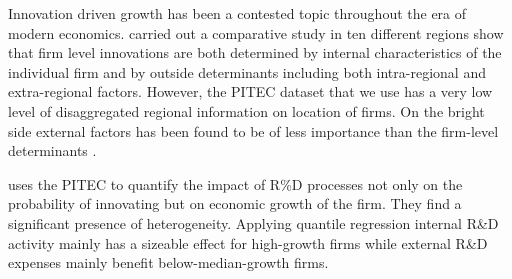 \label{sec:background}
Innovation driven growth has been a contested topic throughout the era of modern economics. \citet{sternberg2001firm} carried out a comparative study in ten different regions show that firm level innovations are both determined by internal characteristics of the individual firm and by outside determinants including both intra-regional and extra-regional factors. However, the PITEC dataset that we use has a very low level of disaggregated regional information on location of firms. On the bright side external factors has been found to be of less importance than the firm-level determinants \citep{sternberg2001firm}.

\citet{segarra2014high} uses the PITEC to quantify the impact of R\%D processes not only on the probability of innovating but on economic growth of the firm. They find a significant presence of heterogeneity. Applying quantile regression internal R\&D activity mainly has a sizeable effect for high-growth firms while external R\&D expenses mainly benefit below-median-growth firms.

